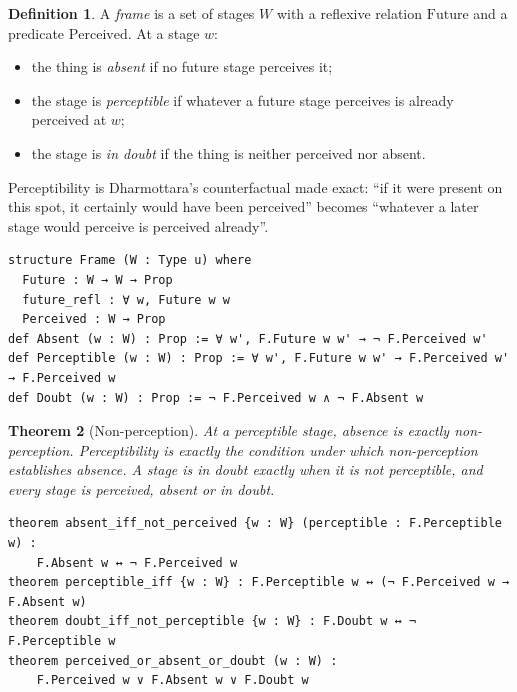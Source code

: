 \documentclass[11pt]{article}
\theoremstyle{plain}
\newtheorem{theorem}{Theorem}[section]
\theoremstyle{definition}
\newtheorem{definition}[theorem]{Definition}
\begin{document}
\begin{definition}
A \emph{frame} is a set of stages $W$ with a reflexive relation $\mathrm{Future}$ and a
predicate $\mathrm{Perceived}$. At a stage $w$:
\begin{itemize}
\item the thing is \emph{absent} if no future stage perceives it;
\item the stage is \emph{perceptible} if whatever a future stage perceives is already
perceived at $w$;
\item the stage is \emph{in doubt} if the thing is neither perceived nor absent.
\end{itemize}
\end{definition}

\noindent Perceptibility is Dharmottara's counterfactual made exact: ``if it were present on
this spot, it certainly would have been perceived'' becomes ``whatever a later stage would
perceive is perceived already''.

\begin{lstlisting}
structure Frame (W : Type u) where
  Future : W → W → Prop
  future_refl : ∀ w, Future w w
  Perceived : W → Prop
def Absent (w : W) : Prop := ∀ w', F.Future w w' → ¬ F.Perceived w'
def Perceptible (w : W) : Prop := ∀ w', F.Future w w' → F.Perceived w' → F.Perceived w
def Doubt (w : W) : Prop := ¬ F.Perceived w ∧ ¬ F.Absent w
\end{lstlisting}

\begin{theorem}[Non-perception]
At a perceptible stage, absence is exactly non-perception. Perceptibility is exactly the
condition under which non-perception establishes absence. A stage is in doubt exactly when
it is not perceptible, and every stage is perceived, absent or in doubt.
\end{theorem}

\begin{lstlisting}
theorem absent_iff_not_perceived {w : W} (perceptible : F.Perceptible w) :
    F.Absent w ↔ ¬ F.Perceived w
theorem perceptible_iff {w : W} : F.Perceptible w ↔ (¬ F.Perceived w → F.Absent w)
theorem doubt_iff_not_perceptible {w : W} : F.Doubt w ↔ ¬ F.Perceptible w
theorem perceived_or_absent_or_doubt (w : W) :
    F.Perceived w ∨ F.Absent w ∨ F.Doubt w
\end{lstlisting}
\end{document}
